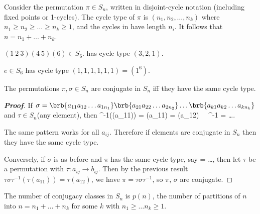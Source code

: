 \begin{definition}
Consider the permutation $\pi \in S_n$, written in disjoint-cycle notation (including fixed points or 1-cycles). The cycle type of $\pi$ is $(n_1,n_2,\dots,n_k)$ where $n_1\geq n_2\geq \dots \geq n_k \geq 1$, and the cycles in have length $n_i$. It follows that $n=n_1+\dots + n_k$.
\end{definition}

\begin{example}
$(1\ 2\ 3)(4\ 5)(6)\in S_6$. has cycle type $(3,2,1)$.

$e\in S_6$ has cycle type $(1,1,1,1,1,1) = (1^6)$.
\end{example}



\begin{theorem}\label{thm:permutation_cycle_type}
The permutations $\pi,\sigma \in S_n$ are conjugate in $S_n$ iff they have the same cycle type.
\end{theorem}

\begin{proof}[\bf Proof]
If $\sigma = \brb{a_{11}a_{12}\dots a_{1n_1}}\brb{a_{21}a_{22}\dots a_{2n_2}}\dots \brb{a_{k1}a_{k2}\dots a_{kn_k}}$ and $\tau \in S_n$(any element), then
\be
\tau \sigma \tau^{-1}(\tau(a_{11})) = \tau \sigma(a_{11}) = \tau(a_{12}) \ \ra \ \tau \sigma \tau^{-1} =  \dots {}.
\ee

The same pattern works for all $a_{ij}$. Therefore if elements are conjugate in $S_n$ then they have the same cycle type.

Conversely, if $\sigma$ is as before and $\pi$ has the same cycle type, say
\be
\pi = \dots {},
\ee
then let $\tau$ be a permutation with $\tau :a_{ij} \to b_{ij}$. Then by the previous result $\tau \sigma \tau^{-1}(\tau(a_{11})) = \tau(a_{12}) $, we have $\pi = \tau \sigma \tau^{-1}$, so $\pi$, $\sigma$ are conjugate.
\end{proof}

\begin{corollary}
The number of conjugacy classes in $S_n$ is $p(n)$, the number of partitions of $n$ into $n=n_1+\dots + n_k $ for some $k$ with $n_1\geq \dots n_k \geq 1$.
\end{corollary}

